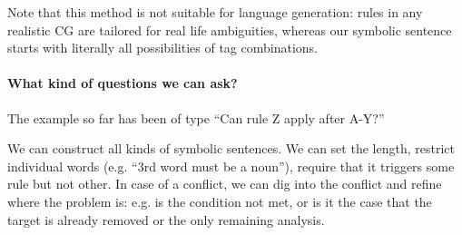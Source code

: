 Note that this method is not suitable for language generation: rules in any realistic CG are tailored for real life ambiguities, whereas our symbolic sentence starts with literally all possibilities of tag combinations.

\paragraph{What kind of questions we can ask?}

The example so far has been of type ``Can rule Z apply after A-Y?''

We can construct all kinds of symbolic sentences. We can set the length, restrict individual words (e.g. ``3rd word must be a noun''), require that it triggers some rule but not other.
In case of a conflict, we can dig into the conflict and refine where the problem is: e.g. is the condition not met, or is it the case that the target is already removed or the only remaining analysis.




